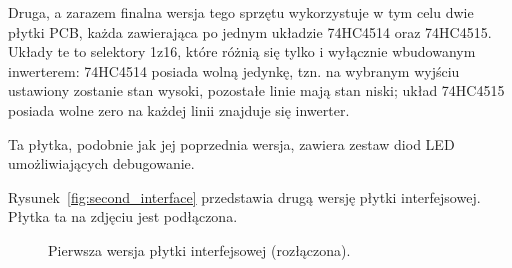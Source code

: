 Druga, a zarazem finalna wersja tego sprzętu wykorzystuje w tym celu dwie płytki PCB, każda zawierająca po jednym układzie 74HC4514 oraz 74HC4515. Układy te to selektory 1\ppauza{}z\ppauza{}16, które różnią się tylko i wyłącznie wbudowanym inwerterem: 74HC4514 posiada wolną jedynkę, tzn. na wybranym wyjściu ustawiony zostanie stan wysoki, pozostałe linie mają stan niski; układ 74HC4515 posiada wolne zero \pauza na każdej linii znajduje się inwerter.

Ta płytka, podobnie jak jej poprzednia wersja, zawiera zestaw diod LED umożliwiających debugowanie.

Rysunek~\ref{fig:second_interface} przedstawia drugą wersję płytki interfejsowej. Płytka ta na zdjęciu jest podłączona.\\

\begin{figure}
 \centering
 \caption[Pierwsza wersja płytki interfejsowej]{Pierwsza wersja płytki interfejsowej (rozłączona).}
 \label{fig:first_interface}
\end{figure}

